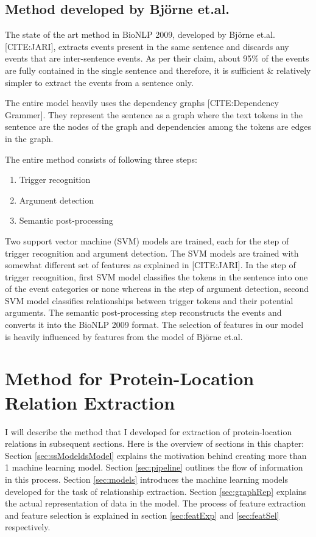 \subsection{Method developed by Björne et.al.}

The state of the art method in BioNLP 2009, developed by Björne et.al. [CITE:JARI], extracts events present in the same sentence and discards any events that are inter-sentence events. As per their claim, about 95\% of the events are fully contained in the single sentence and therefore, it is sufficient \& relatively simpler to extract the events from a sentence only.

The entire model heavily uses the dependency graphs [CITE:Dependency Grammer]. They represent the sentence as a graph where the text tokens in the sentence are the nodes of the graph and dependencies among the tokens are edges in the graph. 

The entire method consists of following three steps:

\begin{enumerate}
\item Trigger recognition
\item Argument detection
\item Semantic post-processing
\end{enumerate}

Two support vector machine (SVM) models are trained, each for the step of trigger recognition and argument detection. The SVM models are trained with somewhat different set of features as explained in [CITE:JARI]. In the step of trigger recognition, first SVM model classifies the tokens in the sentence into one of the event categories or none whereas in the step of argument detection, second SVM model classifies relationships between trigger tokens and their potential arguments. The semantic post-processing step reconstructs the events and converts it into the BioNLP 2009 format. The selection of features in our model is heavily influenced by features from the model of Björne et.al.

\section{Method for Protein-Location Relation Extraction}

I will describe the method that I developed for extraction of protein-location relations in subsequent sections. Here is the overview of sections in this chapter: Section \ref{sec:ssModeldsModel} explains the motivation behind creating more than 1 machine learning model. Section \ref{sec:pipeline} outlines the flow of information in this process. Section \ref{sec:models} introduces the machine learning models developed for the task of relationship extraction. Section \ref{sec:graphRep} explains the actual representation of data in the model. The process of feature extraction and feature selection is explained in section \ref{sec:featExp} and \ref{sec:featSel} respectively.


